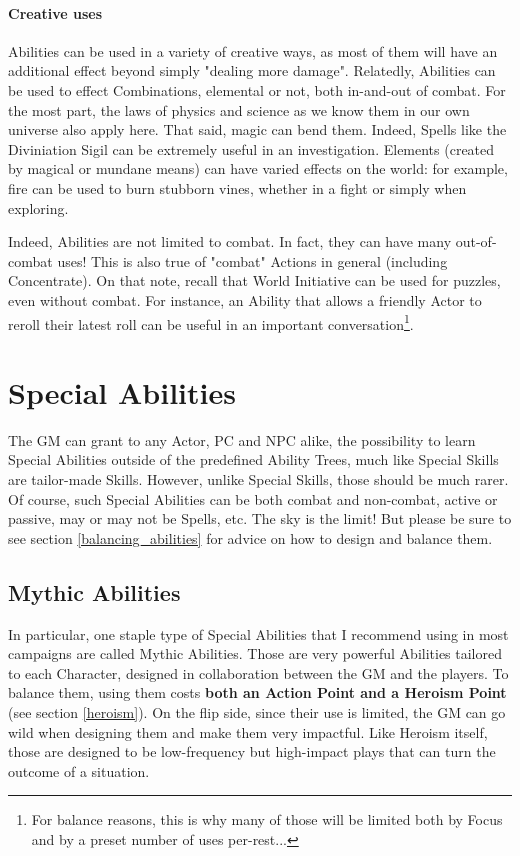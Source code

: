 \paragraph{Creative uses} 

\label{creative_use}

Abilities can be used in a variety of creative ways, as most of them will have an additional effect beyond simply "dealing more damage". Relatedly, Abilities can be used to effect Combinations, elemental or not, both in-and-out of combat. For the most part, the laws of physics and science as we know them in our own universe also apply here. That said, magic can bend them. Indeed, Spells like the Diviniation Sigil can be extremely useful in an investigation. Elements (created by magical or mundane means) can have varied effects on the world: for example, fire can be used to burn stubborn vines, whether in a fight or simply when exploring.

Indeed, Abilities are not limited to combat. In fact, they can have many out-of-combat uses! This is also true of "combat" Actions in general (including Concentrate). On that note, recall that World Initiative can be used for puzzles, even without combat. For instance, an Ability that allows a friendly Actor to reroll their latest roll can be useful in an important conversation\footnote{For balance reasons, this is why many of those will be limited both by Focus and by a preset number of uses per-rest...}.


\section{Special Abilities}

The GM can grant to any Actor, PC and NPC alike, the possibility to learn Special Abilities outside of the predefined Ability Trees, much like Special Skills are tailor-made Skills. However, unlike Special Skills, those should be much rarer. Of course, such Special Abilities can be both combat and non-combat, active or passive, may or may not be Spells, etc. The sky is the limit! But please be sure to see section \ref{balancing_abilities} for advice on how to design and balance them.


\subsection{Mythic Abilities}

\label{signature}

In particular, one staple type of Special Abilities that I recommend using in most campaigns are called Mythic Abilities. Those are very powerful Abilities tailored to each Character, designed in collaboration between the GM and the players. To balance them, using them costs \textbf{both an Action Point and a Heroism Point} (see section \ref{heroism}). On the flip side, since their use is limited, the GM can go wild when designing them and make them very impactful. Like Heroism itself, those are designed to be low-frequency but high-impact plays that can turn the outcome of a situation.

